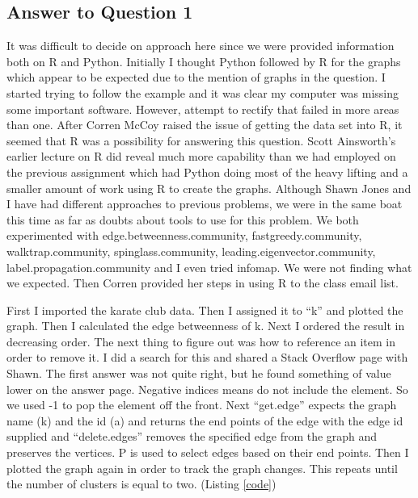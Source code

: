 \documentclass{article}
\begin{document}
\subsection*{Answer to Question 1}

It was difficult to decide on approach here since we were provided information both on R and Python. Initially I thought Python followed by R for the graphs which appear to be expected due to the mention of graphs in the question. I started trying to follow the example and it was clear my computer was missing some important software. However, attempt to rectify that failed in more areas than one. After Corren McCoy raised the issue of getting the data set into R, it seemed that R was a possibility for answering this question. Scott Ainsworth's earlier lecture on R did reveal much more capability than we had employed on the previous assignment which had Python doing most of the heavy lifting and a smaller amount of work using R to create the graphs. Although Shawn Jones and I have had different approaches to previous problems, we were in the same boat this time as far as doubts about tools to use for this problem. We both experimented with edge.betweenness.community, fastgreedy.community, walktrap.community, spinglass.community, leading.eigenvector.community, label.propagation.community and I even tried infomap. We were not finding what we expected. Then Corren provided her steps in using R to the class email list.


First I imported the karate club data. Then I assigned it to ``k'' and plotted the graph. Then I calculated the edge betweenness of k. Next I ordered the result in decreasing order. The next thing to figure out was how to reference an item in order to remove it. I did a search for this and shared a Stack Overflow page with Shawn. The first answer was not quite right, but he found something of value lower on the answer page. Negative indices means do not include the element. So we used -1 to pop the element off the front. Next ``get.edge'' expects the graph name (k) and the id (a) and returns the end points of the edge with the edge id supplied and ``delete.edges'' removes the specified edge from the graph and preserves the vertices. P is used to select edges based on their end points. Then I plotted the graph again in order to track the graph changes. This repeats until the number of clusters is equal to two. (Listing \ref{code})
\end{document}
